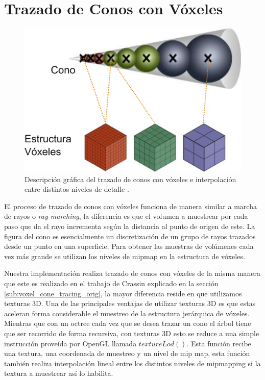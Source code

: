\section{Trazado de Conos con Vóxeles} %

\label{sec:trazado_de_conos_con_voxeles}

\begin{figure}
	\includegraphics[width=0.95\linewidth]{media/vct_explain.png}
	\caption{Descripción gráfica del trazado de conos con vóxeles e interpolación entre distintos niveles de detalle \cite{Oliver:2012:UEE:2341836.2341909}.}
	\label{fig:vct_explain}
\end{figure}

El proceso de trazado de conos con vóxeles funciona de manera similar a marcha de rayos o \emph{ray-marching}, la diferencia es que el volumen a muestrear por cada paso que da el rayo incrementa según la distancia al punto de origen de este. La figura del cono es esencialmente un discretización de un grupo de rayos trazados desde un punto en una superficie. Para obtener las muestras de volúmenes cada vez más grande se utilizan los niveles de mipmap en la estructura de vóxeles.

Nuestra implementación realiza trazado de conos con vóxeles de la misma manera que este es realizado en el trabajo de Crassin explicado en la sección \ref{sub:voxel_cone_tracing_orig}, la mayor diferencia reside en que utilizamos texturas 3D. Una de las principales ventajas de utilizar texturas 3D es que estas aceleran forma considerable el muestreo de la estructura jerárquica de vóxeles. Mientras que con un octree cada vez que se desea trazar un cono el árbol tiene que ser recorrido de forma recursiva, con texturas 3D esto se reduce a una simple instrucción proveída por OpenGL llamada $textureLod()$. Esta función recibe una textura, una coordenada de muestreo y un nivel de mip map, esta función también realiza interpolación lineal entre los distintos niveles de mipmapping si la textura a muestrear así lo habilita.
